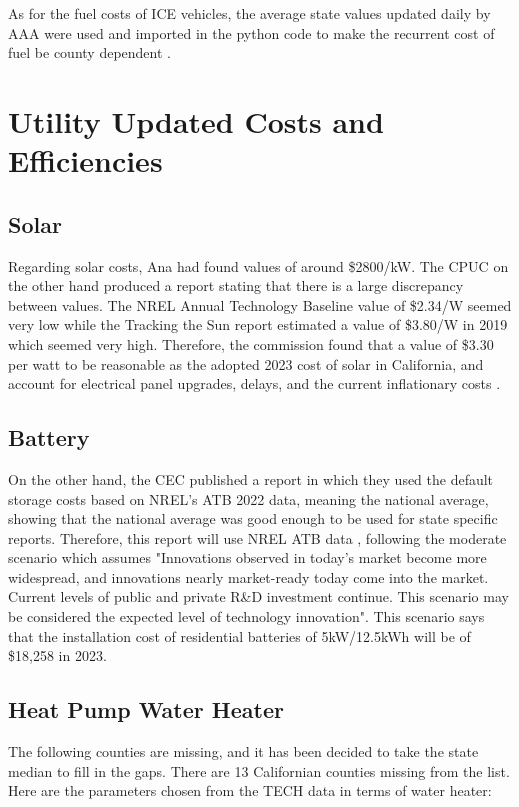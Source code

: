 \documentclass{article}
\begin{document}
As for the fuel costs of ICE vehicles, the average state values updated daily by AAA were used and imported in the python code to make the recurrent cost of fuel be county dependent \cite{AAAFuelPrices}.

\section{Utility Updated Costs and Efficiencies}

\subsection{Solar}

Regarding solar costs, Ana had found values of around \$2800/kW. The CPUC on the other hand produced a report stating that there is a large discrepancy between values. The NREL Annual Technology Baseline value of \$2.34/W seemed very low while the Tracking the Sun report estimated a value of \$3.80/W in 2019 which seemed very high. Therefore, the commission found that a value of \$3.30 per watt to be reasonable as the adopted 2023 cost of solar in California, and account for electrical panel upgrades, delays, and the current inflationary costs \cite{CostofSolar}.

\subsection{Battery}

On the other hand, the CEC published a report \cite{CECStorage} in which they used the default storage costs based on NREL's ATB 2022 data, meaning the national average, showing that the national average was good enough to be used for state specific reports. Therefore, this report will use NREL ATB data \cite{ATB2024}, following the moderate scenario which assumes "Innovations observed in today's market become more widespread, and innovations nearly market-ready today come into the market. Current levels of public and private R\&D investment continue. This scenario may be considered the expected level of technology innovation". This scenario says that the installation cost of residential batteries of 5kW/12.5kWh will be of \$18,258 in 2023. 

\subsection{Heat Pump Water Heater}

The following counties are missing, and it has been decided to take the state median to fill in the gaps. There are 13 Californian counties missing from the list. Here are the parameters chosen from the TECH data in terms of water heater:
\end{document}
